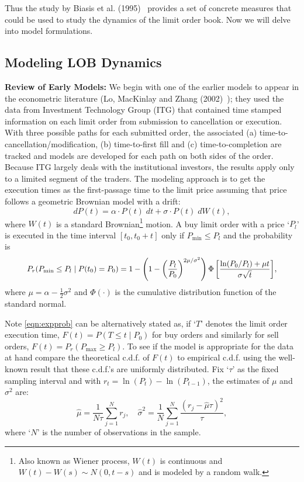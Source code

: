 Thus the study by Biasis et al. (1995)~\cite{spalt} provides a set of concrete measures that could be used to study the dynamics of the limit order book. Now we will delve into model formulations. 


\subsection{Modeling LOB Dynamics\label{sec:model_lob_dynamics_sec}}

\noindent\textbf{Review of Early Models:} We begin with one of the earlier models to appear in the econometric literature (Lo, MacKinlay and Zhang (2002)~\cite{maczhang}); they used the data from Investment Technology Group (ITG) that contained time stamped information on each limit order from submission to cancellation or execution. With three possible paths for each submitted order, the associated (a) time-to-cancellation/modification, (b) time-to-first fill and (c) time-to-completion are tracked and models are developed for each path on both sides of the order. Because ITG largely deals with the institutional investors, the results apply only to a limited segment of the traders. The modeling approach is to get the execution times as the first-passage time to the limit price assuming that price follows a geometric Brownian model with a drift:
	\begin{equation} \label{eqn:dp(t)}
	dP(t)= \alpha \cdot P(t) \; dt + \sigma \cdot P(t) \; dW(t),
	\end{equation}
where $W(t)$ is a standard Brownian\footnote{Also known as Wiener process, $W(t)$ is continuous and $W(t) - W(s) \sim N(0,t-s)$ and is modeled by a random walk.} motion. A buy limit order with a price `$P_l$' is executed in the time interval $[t_0,t_0+t]$ only if $P_{\text{min}} \leq P_l$ and the probability is
	\begin{equation} \label{eqn:expprob}
	\scalebox{0.95}{$P_r(P_{\text{min}} \leq P_l \;|\; P(t_0)=P_0)= 1- \left(1 - \left(\dfrac{P_l}{P_0} \right)^{2\mu/\sigma^2} \right) \Phi\left[ \dfrac{\ln(P_0/P_l) + \mu t}{\sigma \sqrt{t}} \right]$},
	\end{equation}
where $\mu=\alpha - \frac{1}{2} \sigma^2$ and $\Phi(\cdot)$ is the cumulative distribution function of the standard normal. 


Note \eqref{eqn:expprob} can be alternatively stated as, if `$T$' denotes the limit order execution time, $F(t)=P(T \leq t \;|\; P_0)$ for buy orders and similarly for sell orders, $F(t)=P_r(P_{\text{max}} \geq P_l)$. To see if the model is appropriate for the data at hand compare the theoretical c.d.f. of $F(t)$ to empirical c.d.f. using the well-known result that these c.d.f.'s are uniformly distributed. Fix `$\tau$' as the fixed sampling interval and with $r_t=\ln(P_t)-\ln(P_{t-1})$, the estimates of $\mu$ and $\sigma^2$ are:
	\begin{equation} \label{eqn:sampleestm}
	\hat{\mu}= \dfrac{1}{N\tau} \sum_{j=1}^N r_j, \quad \hat{\sigma}^2= \dfrac{1}{N} \sum_{j=1}^N \dfrac{(r_j - \hat{\mu} \tau)^2}{\tau},
	\end{equation}
where `$N$' is the number of observations in the sample. 


